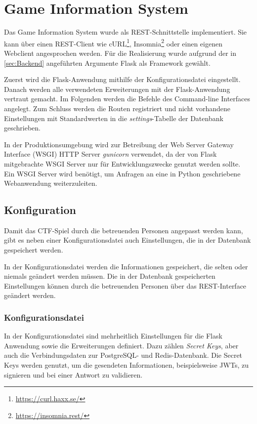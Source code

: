 \textbf{}\section{Game Information System}
Das Game Information System wurde als REST-Schnittstelle implementiert. Sie kann über einen REST-Client wie cURL\footnote{\url{https://curl.haxx.se/}}, Insomnia\footnote{\url{https://insomnia.rest/}} oder einen eigenen Webclient angesprochen werden. Für die Realisierung wurde aufgrund der in \autoref{sec:Backend} angeführten Argumente Flask als Framework gewählt.

Zuerst wird die Flask-Anwendung mithilfe der Konfigurationsdatei eingestellt. Danach werden alle verwendeten Erweiterungen mit der Flask-Anwendung vertraut gemacht. Im Folgenden werden die Befehle des Command-line Interfaces angelegt. Zum Schluss werden die Routen registriert und nicht vorhandene Einstellungen mit Standardwerten in die \textit{settings}-Tabelle der Datenbank geschrieben.

In der Produktionsumgebung wird zur Betreibung der Web Server Gateway Interface \linebreak (WSGI) HTTP Server \textit{gunicorn} verwendet, da der von Flask mitgebrachte WSGI Server nur für Entwicklungszwecke genutzt werden sollte. Ein WSGI Server wird benötigt, um Anfragen an eine in Python geschriebene Webanwendung weiterzuleiten.

\subsection{Konfiguration}
Damit das CTF-Spiel durch die betreuenden Personen angepasst werden kann, gibt es neben einer Konfigurationsdatei auch Einstellungen, die in der Datenbank gespeichert werden.

In der Konfigurationsdatei werden die Informationen gespeichert, die selten oder niemals geändert werden müssen. Die in der Datenbank gespeicherten Einstellungen können durch die betreuenden Personen über das REST-Interface geändert werden.

\subsubsection{Konfigurationsdatei}
In der Konfigurationsdatei sind mehrheitlich Einstellungen für die Flask Anwendung sowie die Erweiterungen definiert. Dazu zählen \textit{Secret Keys}, aber auch die Verbindungsdaten zur PostgreSQL- und Redis-Datenbank. Die Secret Keys werden genutzt, um die gesendeten Informationen, beispielsweise JWTs, zu signieren und bei einer Antwort zu validieren.

